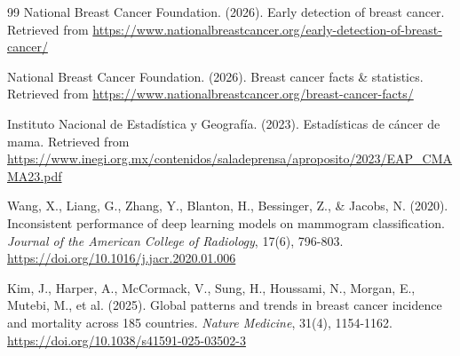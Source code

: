 \begin{thebibliography}{99}
    National Breast Cancer Foundation. (2026). Early detection of breast cancer.
    Retrieved from \url{https://www.nationalbreastcancer.org/early-detection-of-breast-cancer/}

    National Breast Cancer Foundation. (2026). Breast cancer facts \& statistics.
    Retrieved from \url{https://www.nationalbreastcancer.org/breast-cancer-facts/}


    Instituto Nacional de Estadística y Geografía. (2023). Estadísticas de cáncer de mama.
    Retrieved from \url{https://www.inegi.org.mx/contenidos/saladeprensa/aproposito/2023/EAP_CMAMA23.pdf}


    Wang, X., Liang, G., Zhang, Y., Blanton, H., Bessinger, Z., \& Jacobs, N. (2020).
    Inconsistent performance of deep learning models on mammogram classification.
    \textit{Journal of the American College of Radiology}, 17(6), 796-803.
    \url{https://doi.org/10.1016/j.jacr.2020.01.006}

    Kim, J., Harper, A., McCormack, V., Sung, H., Houssami, N., Morgan, E., Mutebi, M.,
    et al. (2025). Global patterns and trends in breast cancer incidence and mortality
    across 185 countries. \textit{Nature Medicine}, 31(4), 1154-1162.
    \url{https://doi.org/10.1038/s41591-025-03502-3}


\end{thebibliography}
